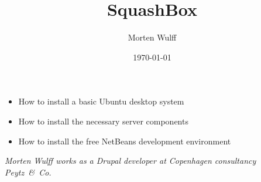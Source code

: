 \documentclass[final,ebook,17pt,oneside,extrafontsizes]{memoir}
\title{SquashBox}
\author{Morten Wulff}
\date{\today}
\begin{document}
\pagecolor{ratatoskbrown}
\color{white}


\vspace*{0em}
\begin{flushright}
\sffamily\scshape\bfseries\Huge\thetitle\par
\end{flushright}
\vspace*{\fill}
\begin{flushright}
\end{flushright}
\thispagestyle{empty}
\clearpage


\footnotesize

\begin{itemize}
\item How to install a basic Ubuntu desktop system
\item How to install the necessary server components
\item How to install the free NetBeans development environment
\end{itemize}

\noindent
\emph{Morten Wulff works as a Drupal developer at Copenhagen consultancy Peytz~\&~Co.}

\color{white}
\vspace*{\fill}
\hspace*{\fill}\EANisbn
\thispagestyle{empty}
\end{document}

